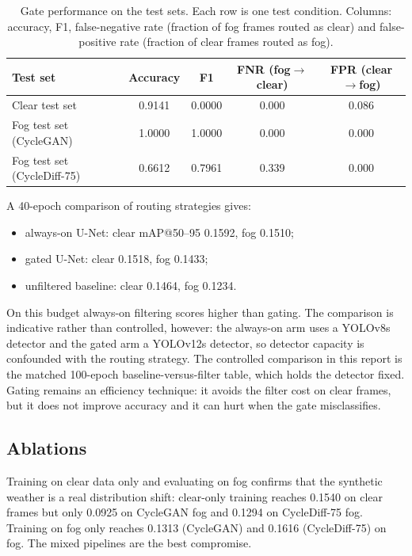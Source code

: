 \documentclass[11pt,a4paper]{article}
\begin{document}
\begin{table}[H]
\centering
\small
\caption{Gate performance on the test sets. Each row is one test condition.
Columns: accuracy, F1, false-negative rate (fraction of fog frames routed as
clear) and false-positive rate (fraction of clear frames routed as fog).}
\label{tab:gate}
\begin{tabular}{@{}lcccc@{}}
\toprule
Test set & Accuracy & F1 & FNR (fog$\rightarrow$clear) & FPR (clear$\rightarrow$fog) \\
\midrule
Clear test set                  & 0.9141 & 0.0000 & 0.000 & 0.086 \\
Fog test set (CycleGAN)         & 1.0000 & 1.0000 & 0.000 & 0.000 \\
Fog test set (CycleDiff-75)     & 0.6612 & 0.7961 & 0.339 & 0.000 \\
\bottomrule
\end{tabular}
\end{table}

A 40-epoch comparison of routing strategies gives:
\begin{itemize}[leftmargin=1.4em]
  \item always-on U-Net: clear mAP@50--95 0.1592, fog 0.1510;
  \item gated U-Net: clear 0.1518, fog 0.1433;
  \item unfiltered baseline: clear 0.1464, fog 0.1234.
\end{itemize}
On this budget always-on filtering scores higher than gating. The comparison
is indicative rather than controlled, however: the always-on arm uses a YOLOv8s
detector and the gated arm a YOLOv12s detector, so detector capacity is
confounded with the routing strategy. The controlled comparison in this report
is the matched 100-epoch baseline-versus-filter table, which holds the detector
fixed. Gating remains an efficiency technique: it avoids the filter cost on
clear frames, but it does not improve accuracy and it can hurt when the gate
misclassifies.

\subsection{Ablations}
Training on clear data only and evaluating on fog confirms that the synthetic
weather is a real distribution shift: clear-only training reaches 0.1540 on
clear frames but only 0.0925 on CycleGAN fog and 0.1294 on CycleDiff-75 fog.
Training on fog only reaches 0.1313 (CycleGAN) and 0.1616 (CycleDiff-75) on fog.
The mixed pipelines are the best compromise.
\end{document}
